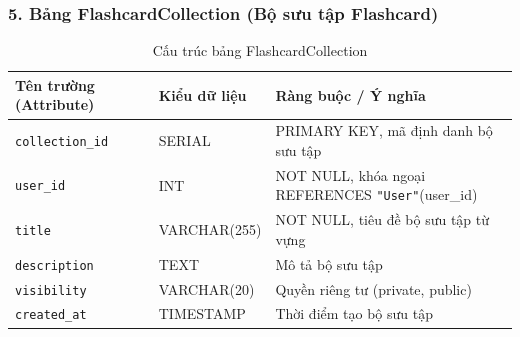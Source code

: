 \documentclass[../DoAn.tex]{subfiles}
\begin{document}
\subsubsection*{5. Bảng FlashcardCollection (Bộ sưu tập Flashcard)}
\begin{table}[H]
\centering
\footnotesize
\renewcommand{\arraystretch}{1.2}
\begin{tabular}{|p{4.2cm}|p{3.2cm}|p{7.1cm}|}
\hline
\textbf{Tên trường (Attribute)} & \textbf{Kiểu dữ liệu} & \textbf{Ràng buộc / Ý nghĩa} \\
\hline
\texttt{collection\_id} & SERIAL & PRIMARY KEY, mã định danh bộ sưu tập \\
\hline
\texttt{user\_id} & INT & NOT NULL, khóa ngoại REFERENCES \texttt{"User"}(user\_id) \\
\hline
\texttt{title} & VARCHAR(255) & NOT NULL, tiêu đề bộ sưu tập từ vựng \\
\hline
\texttt{description} & TEXT & Mô tả bộ sưu tập \\
\hline
\texttt{visibility} & VARCHAR(20) & Quyền riêng tư (private, public) \\
\hline
\texttt{created\_at} & TIMESTAMP & Thời điểm tạo bộ sưu tập \\
\hline
\end{tabular}
\caption{Cấu trúc bảng FlashcardCollection}
\label{tab:schema_flashcardcollection}
\end{table}
\end{document}
